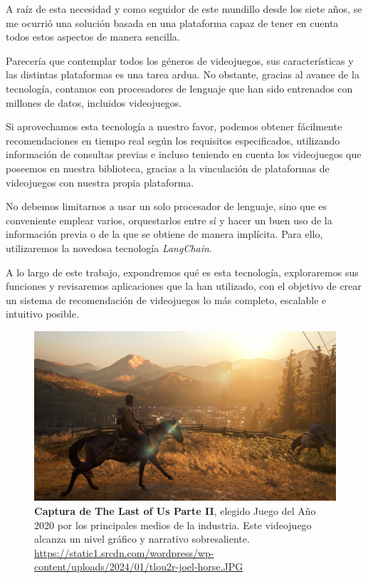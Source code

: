 A raíz de esta necesidad y como seguidor de este mundillo desde los siete años, se me ocurrió una solución basada en una plataforma capaz de tener en cuenta todos estos aspectos de manera sencilla.  


Parecería que contemplar todos los géneros de videojuegos, sus características y las distintas plataformas es una tarea ardua. No obstante, gracias al avance de la tecnología, contamos con procesadores de lenguaje que han sido entrenados con millones de datos, incluidos videojuegos.  

Si aprovechamos esta tecnología a nuestro favor, podemos obtener fácilmente recomendaciones en tiempo real según los requisitos especificados, utilizando información de consultas previas e incluso teniendo en cuenta los videojuegos que poseemos en nuestra biblioteca, gracias a la vinculación de plataformas de videojuegos con nuestra propia plataforma.  


No debemos limitarnos a usar un solo procesador de lenguaje, sino que es conveniente emplear varios, orquestarlos entre sí y hacer un buen uso de la información previa o de la que se obtiene de manera implícita. Para ello, utilizaremos la novedosa tecnología \textit{LangChain}.  

A lo largo de este trabajo, expondremos qué es esta tecnología, exploraremos sus funciones y revisaremos aplicaciones que la han utilizado, con el objetivo de crear un sistema de recomendación de videojuegos lo más completo, escalable e intuitivo posible.  

\begin{figure}[H]
    \centering
    \includegraphics[width=1\linewidth]{imagenes/tlou2.jpg}
    \caption[\textbf{Captura de The Last of Us Parte II}.]{\textbf{Captura de The Last of Us Parte II}, elegido Juego del Año 2020 por los principales medios de la industria. Este videojuego alcanza un nivel gráfico y narrativo sobresaliente. \href{https://static1.srcdn.com/wordpress/wp-content/uploads/2024/01/tlou2r-joel-horse.JPG}{https://static1.srcdn.com/wordpress/wp-content/uploads/2024/01/tlou2r-joel-horse.JPG}}
    \label{foto-the-last-of-us-2}
\end{figure}



